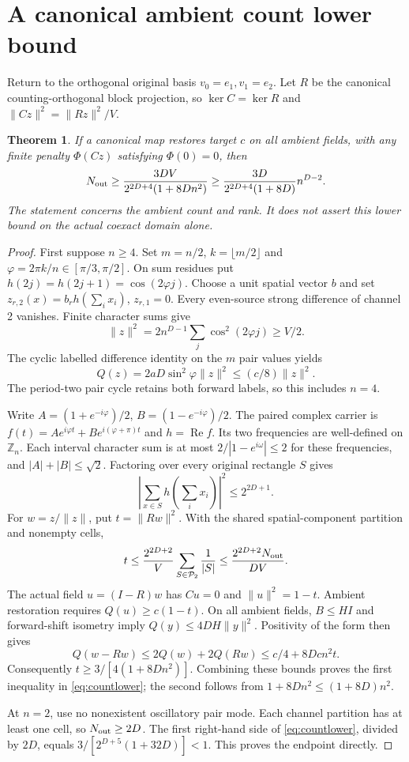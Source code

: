 \documentclass[11pt,a4paper]{article}
\newtheorem{theorem}{Theorem}[section]
\newcommand{\Z}{\mathbb Z}
\newcommand{\norm}[1]{\lVert#1\rVert}
\DeclareMathOperator{\Rea}{Re}
\begin{document}
\section{A canonical ambient count lower bound}\label{sec:canonical}
Return to the orthogonal original basis $v_0=e_1,v_1=e_2$.
Let $R$ be the canonical counting-orthogonal block projection, so
$\ker C=\ker R$ and $\norm{Cz}^2=\norm{Rz}^2/V$.

\begin{theorem}\label{thm:ambientcanonical}
If a canonical map restores target $c$ on all ambient fields, with any finite
penalty $\Phi(Cz)$ satisfying $\Phi(0)=0$, then
\begin{equation}\label{eq:countlower}
 N_{\rm out}\geq
 \frac{3DV}{2^{2D+4}(1+8Dn^2)}
 \geq\frac{3D}{2^{2D+4}(1+8D)}n^{D-2}.
\end{equation}
The statement concerns the ambient count and rank. It does not assert this
lower bound on the actual coexact domain alone.
\end{theorem}
\begin{proof}
First suppose $n\geq4$. Set $m=n/2$, $k=\lfloor m/2\rfloor$ and
$\varphi=2\pi k/n\in[\pi/3,\pi/2]$. On sum residues put
$h(2j)=h(2j+1)=\cos(2\varphi j)$. Choose a unit spatial vector $b$ and
set $z_{r,2}(x)=b_r h(\sum_i x_i)$, $z_{r,1}=0$. Every even-source strong
difference of channel 2 vanishes. Finite character sums give
\[
 \norm z^2=2n^{D-1}\sum_j\cos^2(2\varphi j)\geq V/2.
\]
The cyclic labelled difference identity on the $m$ pair values yields
\[
 Q(z)=2aD\sin^2\varphi\norm z^2\leq(c/8)\norm z^2.
\]
The period-two pair cycle retains both forward labels, so this includes $n=4$.

Write $A=(1+e^{-i\varphi})/2$, $B=(1-e^{-i\varphi})/2$.
The paired complex carrier is
$f(t)=Ae^{i\varphi t}+Be^{i(\varphi+\pi)t}$ and $h=\Rea f$.
Its two frequencies are well-defined on $\Z_n$. Each interval character sum
is at most $2/|1-e^{i\omega}|\leq2$ for these frequencies, and
$|A|+|B|\leq\sqrt2$. Factoring over every original rectangle $S$ gives
\[
 \left|\sum_{x\in S}h(\sum_i x_i)\right|^2\leq2^{2D+1}.
\]
For $w=z/\norm z$, put $t=\norm{Rw}^2$. With the shared spatial-component
partition and nonempty cells,
\[
 t\leq\frac{2^{2D+2}}V\sum_{S\in\mathcal P_2}\frac1{|S|}
 \leq\frac{2^{2D+2}N_{\rm out}}{DV}.
\]
The actual field $u=(I-R)w$ has $Cu=0$ and $\norm u^2=1-t$.
Ambient restoration requires $Q(u)\geq c(1-t)$.
On all ambient fields, $B\leq HI$ and forward-shift isometry imply
$Q(y)\leq4DH\norm y^2$. Positivity of the form then gives
\[
 Q(w-Rw)\leq2Q(w)+2Q(Rw)\leq c/4+8Dcn^2t.
\]
Consequently $t\geq3/[4(1+8Dn^2)]$. Combining these bounds proves the
first inequality in \eqref{eq:countlower}; the second follows from
$1+8Dn^2\leq(1+8D)n^2$.

At $n=2$, use no nonexistent oscillatory pair mode. Each channel partition
has at least one cell, so $N_{\rm out}\geq2D$. The first right-hand side of
\eqref{eq:countlower}, divided by $2D$, equals
$3/[2^{D+5}(1+32D)]<1$. This proves the endpoint directly.
\end{proof}
\end{document}
